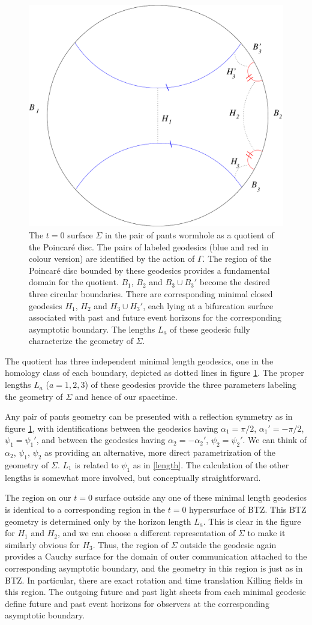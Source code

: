 \documentclass[12pt]{article}
\numberwithin{equation}{section}
\begin{document}
\begin{figure}
\centering
\includegraphics[keepaspectratio,width=0.5\linewidth]{pants.pdf}
\caption{The $t=0$ surface $\Sigma$ in the pair of pants wormhole as a quotient of the Poincar\'e disc. The pairs of labeled geodesics (blue and red in colour version) are identified by the action of $\Gamma$. The region of the Poincar\'e disc bounded by these geodesics provides a fundamental domain for the quotient. $B_1$, $B_2$ and $B_3 \cup B_3'$ become the desired three circular boundaries. There are corresponding minimal closed geodesics $H_1$, $H_2$ and $H_3 \cup H_3'$, each lying at a bifurcation surface associated with past and future event horizons for the corresponding asymptotic boundary. The lengths $L_a$ of these geodesic fully characterize the geometry of $\Sigma$.}
\label{pants}
\end{figure}

The quotient has three independent minimal length geodesics, one in the homology class of each boundary, depicted as dotted lines in figure \ref{pants}. The proper lengths $L_a$ ($a = 1,2,3$) of these geodesics provide the three parameters labeling the geometry of $\Sigma$ and hence of our spacetime.

Any pair of pants geometry can be presented with a reflection symmetry as in figure \ref{pants}, with identifications between the geodesics having $\alpha_1 = \pi/2$, $\alpha_1' = - \pi/2$, $\psi_1 = \psi_1'$, and between the geodesics having $\alpha_2 = - \alpha_2'$, $\psi_2 = \psi_2'$. We can think of $\alpha_2$, $\psi_1$, $\psi_2$ as providing an alternative, more direct parametrization of the geometry of $\Sigma$. $L_1$ is related to $\psi_1$ as in \eqref{length}. The calculation of the other lengths is somewhat more involved, but conceptually straightforward.

The region on our $t=0$ surface outside any one of these minimal length geodesics is identical to a corresponding region in the $t=0$ hypersurface of BTZ. This BTZ geometry is determined only by the horizon length $L_a$. This is clear in the figure for $H_1$ and $H_2$, and we can choose a different representation of $\Sigma$ to make it similarly obvious for $H_3$. Thus, the region of $\Sigma$ outside the geodesic again provides a Cauchy surface for the domain of outer communication attached to the corresponding asymptotic boundary, and the geometry in this region is just as in BTZ. In particular, there are exact rotation and time translation Killing fields in this region.  The outgoing future and past light sheets from each minimal geodesic define future and past event horizons for observers at the corresponding asymptotic boundary.
\end{document}
